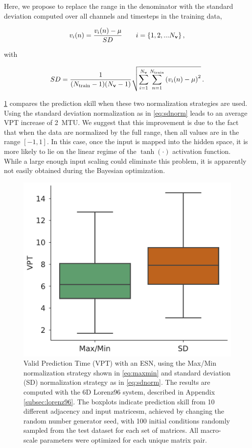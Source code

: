 \documentclass[draft]{agujournal2019}
\begin{document}
Here, we propose to replace the range in the denominator with the
standard deviation computed over all channels and timesteps in the training
data,
\begin{linenomath*}\begin{equation}
    v_i(n) = \dfrac{v_i(n) - \mu}{SD}
    \qquad i = \{1,2, ... N_{\mathbf{v}}\} \, ,
    \label{eq:sdnorm}
\end{equation}\end{linenomath*}
with
\begin{linenomath*}\begin{equation*}
    SD = \dfrac{1}{(N_\text{train}-1)(N_{\mathbf{v}}-1)}
    \sqrt{
        \sum_{i=1}^{N_{\mathbf{v}}}\sum_{n=1}^{N_\text{train}}\left(v_i(n) - \mu\right)^2
    }\, .
\end{equation*}\end{linenomath*}

\cref{fig:data-norm} compares the prediction skill when these two normalization
strategies are used.
Using the standard deviation normalization as in \cref{eq:sdnorm} leads to an
average VPT increase of 2~MTU.
We suggest that this improvement is due to the fact that when the data are
normalized by the full range, then all values are in the range $[-1,1]$.
In this case, once the input is mapped into the hidden space, it is more likely
to lie on the linear regime of the $\tanh(\cdot)$ activation function.
While a large enough input scaling could eliminate this problem, it is
apparently not easily obtained during the Bayesian optimization.

\begin{figure}
    \centering
    \includegraphics[width=.4\textwidth]{figures/data-normalization.pdf}
    \caption{Valid Prediction Time (VPT) with an ESN, using the
        Max/Min normalization strategy shown in \cref{eq:maxmin} and standard
        deviation (SD)
        normalization strategy as in \cref{eq:sdnorm}.
        The results are computed with the 6D Lorenz96 system, described in
        Appendix \cref{subsec:lorenz96}.
        The boxplots indicate prediction skill from 10 different adjacency and
        input matricesm, achieved by changing the random number generator seed,
        with 100 initial conditions randomly sampled from the test dataset for
        each set of matrices.
        All macro-scale parameters were optimized for each unique matrix pair.
    }
    \label{fig:data-norm}
\end{figure}
\end{document}
